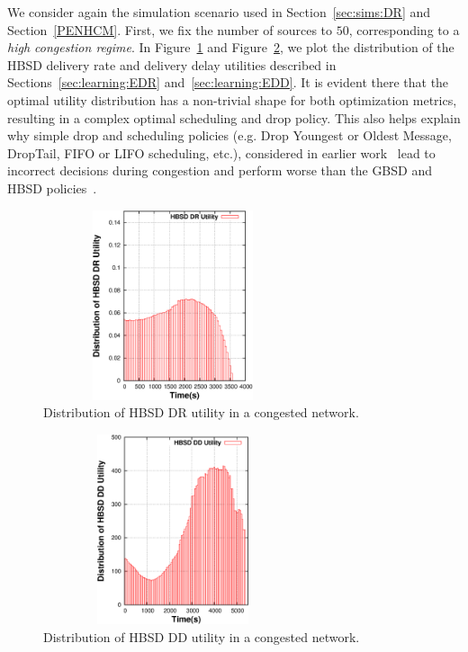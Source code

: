 We consider again the simulation scenario used in Section~\ref{sec:sims:DR} and Section~\ref{PENHCM}. First, we fix the number of sources to $50$, corresponding to a \emph{high congestion regime}. In Figure~\ref{HBSD-DR-HCN} and Figure~\ref{HBSD-DD-HCN}, we plot the distribution of the HBSD delivery rate and delivery delay utilities described in Sections~\ref{sec:learning:EDR} and~\ref{sec:learning:EDD}. It is evident there that the optimal utility distribution has a non-trivial shape for both optimization metrics, resulting in a complex optimal scheduling and drop policy. This also helps explain why simple drop and scheduling policies (e.g. Drop Youngest or Oldest Message, DropTail, FIFO or LIFO scheduling, etc.), considered in earlier work~\cite{Towsley:Epidemic, KrifaBS08} lead to incorrect decisions during congestion and perform worse than the GBSD and HBSD policies~\cite{KrifaBS08}.

\begin{figure}[!h]
  \begin{center}
    \includegraphics[width=3in,height=2.2in]{Chapitre3/fig18.eps}
  \end{center}
  \caption{Distribution of HBSD DR utility in a congested network.}
  \label{HBSD-DR-HCN}
\end{figure}

\begin{figure}[!h]
  \begin{center}
    \includegraphics[width=3in,height=2.2in]{Chapitre3/fig16.eps}
  \end{center}
  \caption{Distribution of HBSD DD utility in a congested network.}
  \label{HBSD-DD-HCN}
\end{figure}

